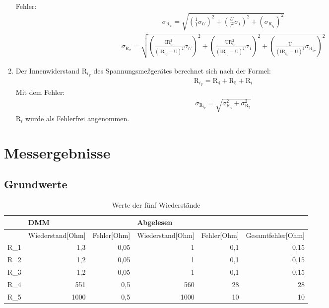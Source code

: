 \documentclass[12pt]{scrartcl}
\begin{document}
\begin{enumerate}
	Fehler:
	\begin{align}
	\sigma_{\text{R}_x}=
	\sqrt{\left(\frac{1}								{\text{I}}\sigma_U\right)^2+
	\left(\frac{U}{I^2}\sigma_I\right)^2+
	\left(\sigma_{\text{R}_{i_I}}\right)^2}
	\label{eqn:aufgabe_3_schaltung_2_sigma}
	\end{align}		
	\begin{align}
	\sigma_{\text{R}_x}=
	\sqrt{\left(\frac{\text{I}
	\text{R}_{i_U}^2}								{(\text{I}\text{R}_{i_U}-
	\text{U})^2}\sigma_U\right)^2+
	\left(\frac{\text{U}\text{R}_{i_U}^2}			{(\text{I}\text{R}_{i_U}-
	\text{U})^2}\sigma_I\right)^2+
	\left(\frac{\text{U}}							{(\text{I}\text{R}_{i_U}-
	\text{U})^2}\sigma_{
	\text{R}_{i_U}}\right)^2}
	\label{eqn:aufgabe_3_schaltung_1_sigma}
	\end{align}	 
	\item
	Der Innenwiderstand R$_{i_V}$ des Spannungsmeßgerätes berechnet sich nach der Formel:
	\begin{align}
	\text{R}_{i_V} = \text{R}_4 + \text{R}_5 + \text{R}_i 
	\label{eqn:aufgabe_4}
	\end{align}
	Mit dem Fehler:
	\begin{align}
	\sigma_{\text{R}_{i_V}} = \sqrt{\sigma_{\text{R}_4}^2 + \sigma_{\text{R}_5}^2}
	\label{eqn:aufgabe_4_sigma}
	\end{align}
	R$_i$ wurde als Fehlerfrei angenommen.
	
\end{enumerate}


\section{Messergebnisse}

\subsection{Grundwerte}
\begin{table}[htbp]
\caption{Werte der fünf Wiederstände}
\begin{tabular}{|l|r|r|r|r|r|}
\hline
 & \multicolumn{1}{l|}{DMM} & \multicolumn{1}{l|}{} & \multicolumn{1}{l|}{Abgelesen} & \multicolumn{1}{l|}{} & \multicolumn{1}{l|}{} \\ \hline
 & \multicolumn{1}{l|}{Wiederstand[Ohm]} & \multicolumn{1}{l|}{Fehler[Ohm]} & \multicolumn{1}{l|}{Wiederstand[Ohm]} & \multicolumn{1}{l|}{Fehler[Ohm]} & \multicolumn{1}{l|}{Gesamtfehler[Ohm]} \\ \hline
R\_1 & 1,3 & 0,05 & 1 & 0,1 & 0,15 \\ \hline
R\_2 & 1,2 & 0,05 & 1 & 0,1 & 0,15 \\ \hline
R\_3 & 1,2 & 0,05 & 1 & 0,1 & 0,15 \\ \hline
R\_4 & 551 & 0,5 & 560 & 28 & 28 \\ \hline
R\_5 & 1000 & 0,5 & 1000 & 10 & 10 \\ \hline
\end{tabular}
\label{grundwerte}
\end{table}
\end{document}
